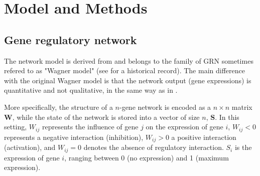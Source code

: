 \documentclass[10pt,a4paper]{article}
\begin{document}







\section{Model and Methods}

\subsection{Gene regulatory network}

The network model is derived from \cite{Wag94,Wag96} and belongs to the family of GRN sometimes refered to as "Wagner model" (see \citet{FP15} for a historical record). The main difference with the original Wagner model is that the network output (gene expressions) is quantitative and not qualitative, in the same way as in \cite{SB02}. 

More specifically, the structure of a $n$-gene network is encoded as a $n\times n$ matrix $\bm W$, while the state of the network is stored into a vector of size $n$, $\bm S$. In this setting, $W_{ij}$ represents the influence of gene $j$ on the expression of gene $i$, $W_{ij} < 0$ represents a negative interaction (inhibition), $W_{ij} > 0$ a positive interaction (activation), and $W_{ij} = 0$ denotes the absence of regulatory interaction. $S_i$ is the expression of gene $i$, ranging between 0 (no expression) and 1 (maximum expression). 
\end{document}
